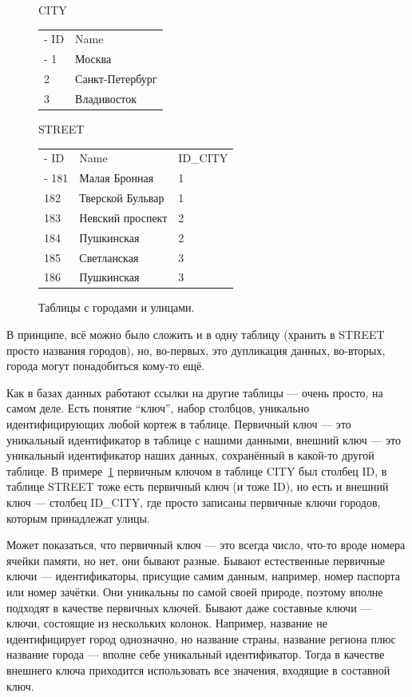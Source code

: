 \documentclass[a5paper]{article}
\begin{document}
\begin{figure}
	\begin{center}
		CITY
		\begin{tabu} {| X[0.2 l p] | X[1 l p] |}
			\tabucline-
			ID      & Name \\
			\tabucline-
			\everyrow{\tabucline-}
			1       & Москва \\
			2       & Санкт-Петербург \\
			3       & Владивосток \\
		\end{tabu}
		\vspace{3mm}
		STREET
		\begin{tabu} {| X[0.2 l p] | X[1 l p] | X[0.7 l p] |}
			\tabucline-
			ID       & Name             & ID\_CITY \\
			\tabucline-
			\everyrow{\tabucline-}
			181      & Малая Бронная    & 1 \\
			182      & Тверской Бульвар & 1 \\
			183      & Невский проспект & 2 \\
			184      & Пушкинская       & 2 \\
			185      & Светланская      & 3 \\
			186      & Пушкинская       & 3 \\
		\end{tabu}
	\end{center}
	\caption{Таблицы с городами и улицами.}
	\label{table:citiesStreets}
\end{figure}

В принципе, всё можно было сложить и в одну таблицу (хранить в STREET просто названия городов), но, во-первых, это дупликация данных, во-вторых, города могут понадобиться кому-то ещё.

Как в базах данных работают ссылки на другие таблицы --- очень просто, на самом деле. Есть понятие ``ключ'', набор столбцов, уникально идентифицирующих любой кортеж в таблице. Первичный ключ --- это уникальный идентификатор в таблице с нашими данными, внешний ключ --- это уникальный идентификатор наших данных, сохранённый в какой-то другой таблице. В примере~\ref{table:citiesStreets} первичным ключом в таблице CITY был столбец ID, в таблице STREET тоже есть первичный ключ (и тоже ID), но есть и внешний ключ --- столбец ID\_CITY, где просто записаны первичные ключи городов, которым принадлежат улицы. 

Может показаться, что первичный ключ --- это всегда число, что-то вроде номера ячейки памяти, но нет, они бывают разные. Бывают естественные первичные ключи --- идентификаторы, присущие самим данным, например, номер паспорта или номер зачётки. Они уникальны по самой своей природе, поэтому вполне подходят в качестве первичных ключей. Бывают даже составные ключи --- ключи, состоящие из нескольких колонок. Например, название не идентифицирует город однозначно, но название страны, название региона плюс название города --- вполне себе уникальный идентификатор. Тогда в качестве внешнего ключа приходится использовать все значения, входящие в составной ключ.
\end{document}
